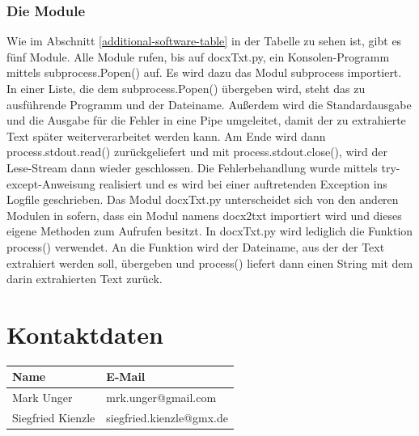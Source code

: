 \documentclass[12pt]{scrartcl}
\begin{document}
\subsubsection{Die Module}
\label{sec:technical-background-module}
Wie im Abschnitt \ref{additional-software-table} in der Tabelle zu sehen ist, gibt es fünf Module. Alle Module rufen, bis auf docxTxt.py, ein Konsolen-Programm mittels subprocess.Popen() auf.
Es wird dazu das Modul subprocess importiert. In einer Liste, die dem subprocess.Popen() übergeben wird, steht das zu ausführende Programm und der Dateiname. Außerdem wird die Standardausgabe und die Ausgabe für die Fehler in eine Pipe umgeleitet, damit der zu extrahierte Text später weiterverarbeitet werden kann. Am Ende wird dann process.stdout.read() zurückgeliefert und mit process.stdout.close(), wird der Lese-Stream dann wieder geschlossen.
Die Fehlerbehandlung wurde mittels try-except-Anweisung realisiert und es wird bei einer auftretenden Exception ins Logfile geschrieben. 
\newline
Das Modul docxTxt.py unterscheidet sich von den anderen Modulen in sofern, dass ein Modul namens docx2txt importiert wird und dieses eigene Methoden zum Aufrufen besitzt. In docxTxt.py wird lediglich die Funktion process() verwendet. 
An die Funktion wird der Dateiname, aus der der Text extrahiert werden soll, übergeben und process() liefert dann einen String mit dem darin extrahierten Text zurück. 
\newpage
\section{Kontaktdaten}
\label{sec:kontaktdaten}
\begin{table}[H]
\label{kontaktdaten}
\begin{tabular}{|l|l|}
\hline
\rowcolor[HTML]{9B9B9B} 
Name              & E-Mail                   \\ \hline
Mark Unger        & mrk.unger@gmail.com      \\ \hline
Siegfried Kienzle & siegfried.kienzle@gmx.de \\ \hline
\end{tabular}
\end{table}
\end{document}
